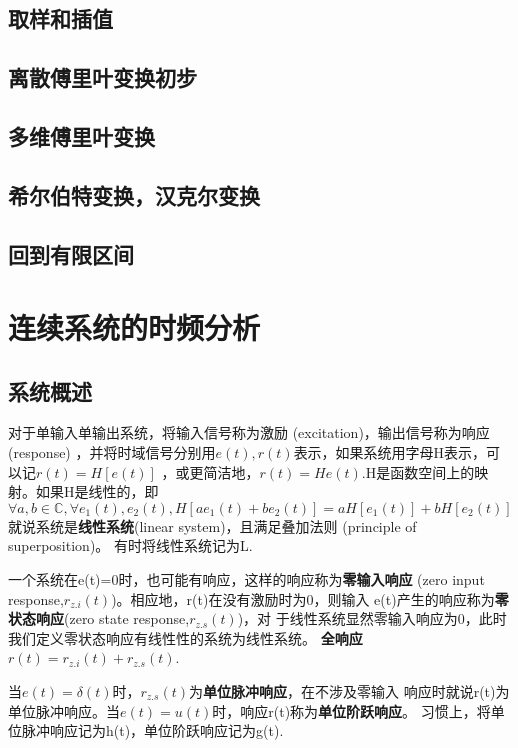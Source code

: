 \documentclass{ctexbook}
\begin{document}
\section{取样和插值}\label{sec:Sampling and Interpolation}

\section{离散傅里叶变换初步}\label{sec:simple_DFT}

\section{多维傅里叶变换}\label{sec:Multi_Fourier}

\section{希尔伯特变换，汉克尔变换}\label{sec:Hilbert_Hankel}

\section{回到有限区间}\label{sec:Finite_Interval}

\chapter{连续系统的时频分析}%

\section{系统概述}
对于单输入单输出系统，将输入信号称为激励 (excitation)，输出信号称为响应 (response)
，并将时域信号分别用$e(t),r(t)$表示，如果系统用字母H表示，可以记$r(t)=H[e(t)]$
，或更简洁地，$r(t)=He(t)$.H是函数空间上的映射。如果H是线性的，即
\[\forall a,b\in\mathbb{C},\forall e_1(t),e_2(t),H[ae_1(t)+be_2(t)]=aH[e_1(t)]+bH[e_2(t)]\]
就说系统是\textbf{线性系统}(linear system)，且满足叠加法则 (principle of superposition)。
有时将线性系统记为L.

一个系统在e(t)=0时，也可能有响应，这样的响应称为\textbf{零输入响应}
(zero input response,$r_{z.i}(t)$)。相应地，r(t)在没有激励时为0，则输入
e(t)产生的响应称为\textbf{零状态响应}(zero state response,$r_{z.s}(t)$)，对
于线性系统显然零输入响应为0，此时我们定义零状态响应有线性性的系统为线性系统。
\textbf{全响应}$r(t)=r_{z.i}(t)+r_{z.s}(t)$.

当$e(t)=\delta(t)$时，$r_{z.s}(t)$为\textbf{单位脉冲响应}，在不涉及零输入
响应时就说r(t)为单位脉冲响应。当$e(t)=u(t)$时，响应r(t)称为\textbf{单位阶跃响应}。
习惯上，将单位脉冲响应记为h(t)，单位阶跃响应记为g(t).
\end{document}
